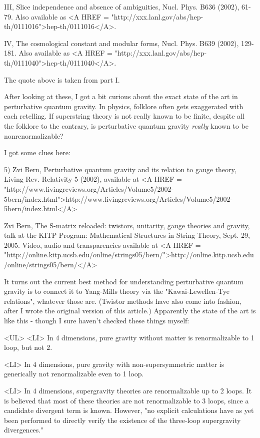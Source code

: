 III, Slice independence and absence of ambiguities, Nucl. Phys. B636 
(2002), 61-79.  Also available as <A HREF = "http://xxx.lanl.gov/abs/hep-th/0111016">hep-th/0111016</A>.  

IV, The cosmological constant and modular forms, Nucl. Phys. B639 (2002), 
129-181.  Also available as <A HREF = "http://xxx.lanl.gov/abs/hep-th/0111040">hep-th/0111040</A>.

The quote above is taken from part I.  

After looking at these, I got a bit curious about the exact state of 
the art in perturbative quantum gravity.  In physics, folklore often
gets exaggerated with each retelling.  If superstring theory is not 
really known to be finite, despite all the folklore to the
contrary, is perturbative quantum gravity \emph{really} known to be 
nonrenormalizable?   

I got some clues here:

5) Zvi Bern, Perturbative quantum gravity and its relation to gauge 
theory, Living Rev. Relativity 5 (2002), available at
<A HREF = "http://www.livingreviews.org/Articles/Volume5/2002-5bern/index.html">http://www.livingreviews.org/Articles/Volume5/2002-5bern/index.html</A>

Zvi Bern, The S-matrix reloaded: twistors, unitarity, gauge theories 
and gravity, talk at the KITP Program: Mathematical Structures in 
String Theory, Sept. 29, 2005.  Video, audio and transparencies available
at <A HREF = "http://online.kitp.ucsb.edu/online/strings05/bern/">http://online.kitp.ucsb.edu/online/strings05/bern/</A> 

It turns out the current best method for understanding perturbative 
quantum gravity is to connect it to Yang-Mills theory via the
"Kawai-Lewellen-Tye relations", whatever those are.  
(Twistor methods have also come into fashion, after I wrote the
original version of this article.)  Apparently 
the state of the art is like this - though I sure haven't checked
these things myself:

<UL>
<LI>
In 4 dimensions, pure gravity without matter is renormalizable to 
  1 loop, but not 2.

<LI>
  In 4 dimensions, pure gravity with non-supersymmetric matter is 
  generically not renormalizable even to 1 loop.

<LI>
  In 4 dimensions, supergravity theories are renormalizable up to
  2 loops.  It is believed that most of these theories are not
  renormalizable to 3 loops, since a candidate divergent term is
  known.  However, "no explicit calculations have as yet been 
  performed to directly verify the existence of the three-loop 
  supergravity divergences." 

